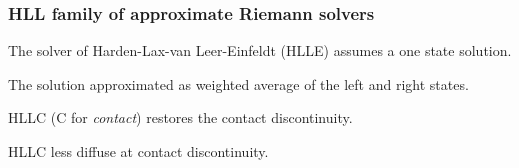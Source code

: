 \documentclass{beamer}
\begin{document}
\begin{frame}[fragile]

\end{frame}

\begin{frame}[fragile]
\frametitle{HLL family of approximate Riemann solvers}
\bei
\item The solver of Harden-Lax-van Leer-Einfeldt (HLLE) \citep{Einfeldt:1988} assumes a one state solution.
\item The solution approximated as weighted average of the left and right states.
\pause
\item HLLC \citep{Toro:1994} (C for \emph{contact}) restores the contact discontinuity.
\pause
\item HLLC less diffuse at contact discontinuity.
\ebi
\end{frame}
\end{document}
